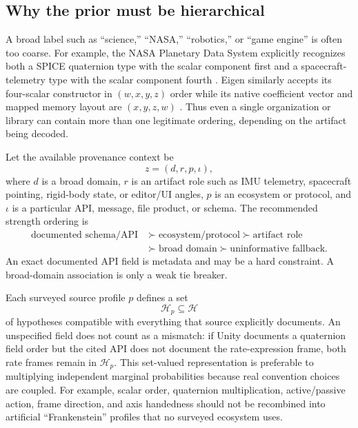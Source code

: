 \documentclass[11pt]{article}
\begin{document}
    \subsection{Why the prior must be hierarchical}

    A broad label such as ``science,'' ``NASA,'' ``robotics,'' or ``game engine'' is often
    too coarse. For example, the NASA Planetary Data System explicitly recognizes both a
    SPICE quaternion type with the scalar component first and a spacecraft-telemetry type
    with the scalar component fourth \cite{nasaPDSQuaternion}. Eigen similarly accepts its
    four-scalar constructor in $(w,x,y,z)$ order while its native coefficient vector and
    mapped memory layout are $(x,y,z,w)$ \cite{eigenQuaternion}. Thus even a single
    organization or library can contain more than one legitimate ordering, depending on the
    artifact being decoded.

    Let the available provenance context be
    \begin{equation}
        z=(d,r,p,\iota),
    \end{equation}
    where $d$ is a broad domain, $r$ is an artifact role such as IMU telemetry, spacecraft
    pointing, rigid-body state, or editor/UI angles, $p$ is an ecosystem or protocol, and
    $\iota$ is a particular API, message, file product, or schema. The recommended strength
    ordering is
    \begin{equation}
        \boxed{\begin{aligned}
                   \text{documented schema/API}
                   &\succ \text{ecosystem/protocol}
                   \succ \text{artifact role} \\
                   &\succ \text{broad domain}
                   \succ \text{uninformative fallback}.
        \end{aligned}}
        \label{eq:prior-hierarchy}
    \end{equation}
    An exact documented API field is metadata and may be a hard constraint. A broad-domain
    association is only a weak tie breaker.

    Each surveyed source profile $p$ defines a set
    \begin{equation}
        \mathcal H_p\subseteq\mathcal H
        \label{eq:profile-compatible-set}
    \end{equation}
    of hypotheses compatible with everything that source explicitly documents. An
    unspecified field does not count as a mismatch: if Unity documents a quaternion field
    order but the cited API does not document the rate-expression frame, both rate frames
    remain in $\mathcal H_p$. This set-valued representation is preferable to multiplying
    independent marginal probabilities because real convention choices are coupled. For
    example, scalar order, quaternion multiplication, active/passive action, frame direction,
    and axis handedness should not be recombined into artificial ``Frankenstein'' profiles
    that no surveyed ecosystem uses.
\end{document}
